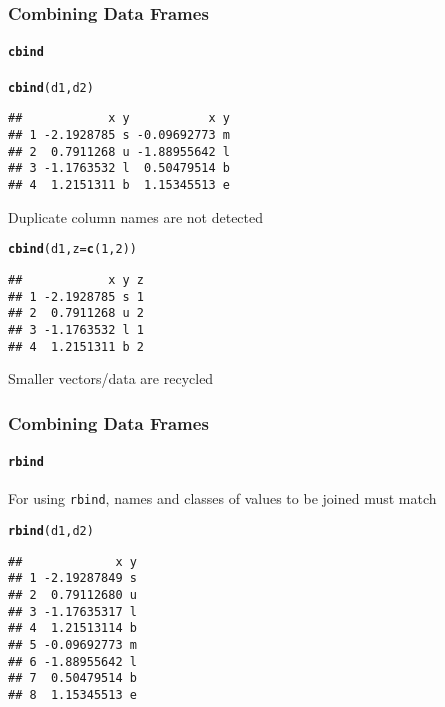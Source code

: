 \documentclass[paper=screen,mathserif]{beamer}\usepackage[]{graphicx}\usepackage[]{color}
\makeatletter
\newcommand{\hlnum}[1]{\textcolor[rgb]{0.686,0.059,0.569}{#1}}%
\newcommand{\hlstd}[1]{\textcolor[rgb]{0.345,0.345,0.345}{#1}}%
\newcommand{\hlkwc}[1]{\textcolor[rgb]{0.333,0.667,0.333}{#1}}%
\newcommand{\hlkwd}[1]{\textcolor[rgb]{0.737,0.353,0.396}{\textbf{#1}}}%
\newenvironment{kframe}{%
 \def\at@end@of@kframe{}%
 \ifinner\ifhmode%
  \def\at@end@of@kframe{\end{minipage}}%
  \begin{minipage}{\columnwidth}%
 \fi\fi%
 \def\FrameCommand##1{\hskip\@totalleftmargin \hskip-\fboxsep
 \colorbox{shadecolor}{##1}\hskip-\fboxsep
     \hskip-\linewidth \hskip-\@totalleftmargin \hskip\columnwidth}%
 \MakeFramed {\advance\hsize-\width
   \@totalleftmargin\z@ \linewidth\hsize
   \@setminipage}}%
 {\par\unskip\endMakeFramed%
 \at@end@of@kframe}
\newenvironment{knitrout}{}{} %
\newcommand{\ft}[1]{\frametitle{#1}}
\newcommand{\fst}[1]{\framesubtitle{#1}}
\makeatother
\begin{document}
\begin{frame}[fragile]
  \ft{Combining Data Frames}  
  \fst{{\tt cbind}}
\begin{knitrout}\scriptsize
{}\color{fgcolor}\begin{kframe}
\begin{alltt}
\hlkwd{cbind}\hlstd{(d1, d2)}
\end{alltt}
\begin{verbatim}
##            x y           x y
## 1 -2.1928785 s -0.09692773 m
## 2  0.7911268 u -1.88955642 l
## 3 -1.1763532 l  0.50479514 b
## 4  1.2151311 b  1.15345513 e
\end{verbatim}
\end{kframe}
\end{knitrout}
{\small Duplicate column names are not detected}
\pause 
\begin{knitrout}\scriptsize
{}\color{fgcolor}\begin{kframe}
\begin{alltt}
\hlkwd{cbind}\hlstd{(d1,} \hlkwc{z} \hlstd{=} \hlkwd{c}\hlstd{(}\hlnum{1}\hlstd{,} \hlnum{2}\hlstd{))}
\end{alltt}
\begin{verbatim}
##            x y z
## 1 -2.1928785 s 1
## 2  0.7911268 u 2
## 3 -1.1763532 l 1
## 4  1.2151311 b 2
\end{verbatim}
\end{kframe}
\end{knitrout}
{\small Smaller vectors/data are recycled}
\end{frame}

\begin{frame}[fragile]
  \ft{Combining Data Frames}  
  \fst{{\tt rbind}}
  
  For using \verb=rbind=, names and classes of values to be joined
  must match 
\begin{knitrout}\scriptsize
{}\color{fgcolor}\begin{kframe}
\begin{alltt}
\hlkwd{rbind}\hlstd{(d1, d2)}
\end{alltt}
\begin{verbatim}
##             x y
## 1 -2.19287849 s
## 2  0.79112680 u
## 3 -1.17635317 l
## 4  1.21513114 b
## 5 -0.09692773 m
## 6 -1.88955642 l
## 7  0.50479514 b
## 8  1.15345513 e
\end{verbatim}
\end{kframe}
\end{knitrout}
  
\end{frame}
\end{document}
